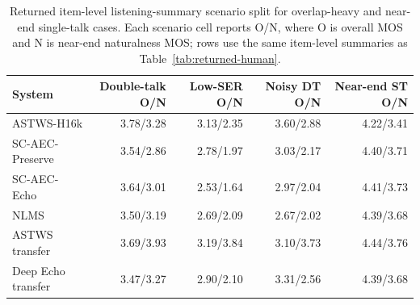 \begin{table}[t]
\caption{Returned item-level listening-summary scenario split for overlap-heavy and near-end single-talk cases. Each scenario cell reports O/N, where O is overall MOS and N is near-end naturalness MOS; rows use the same item-level summaries as Table~\ref{tab:returned-human}.}
\label{tab:returned-human-scenario}
\centering
\footnotesize
\begin{tabular}{lrrrr}
\hline
System & Double-talk O/N & Low-SER O/N & Noisy DT O/N & Near-end ST O/N \\
\hline
ASTWS-H16k & 3.78/3.28 & 3.13/2.35 & 3.60/2.88 & 4.22/3.41 \\
SC-AEC-Preserve & 3.54/2.86 & 2.78/1.97 & 3.03/2.17 & 4.40/3.71 \\
SC-AEC-Echo & 3.64/3.01 & 2.53/1.64 & 2.97/2.04 & 4.41/3.73 \\
NLMS & 3.50/3.19 & 2.69/2.09 & 2.67/2.02 & 4.39/3.68 \\
ASTWS transfer & 3.69/3.93 & 3.19/3.84 & 3.10/3.73 & 4.44/3.76 \\
Deep Echo transfer & 3.47/3.27 & 2.90/2.10 & 3.31/2.56 & 4.39/3.68 \\
\hline
\end{tabular}
\end{table}
